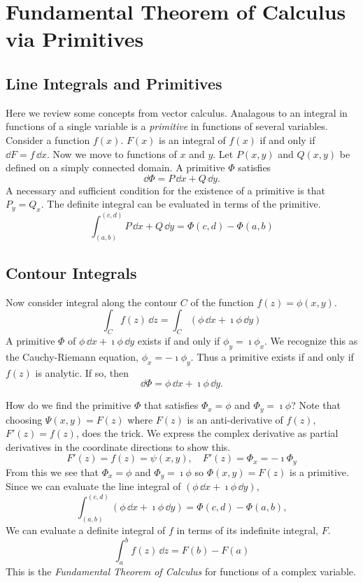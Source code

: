 \section{Fundamental Theorem of Calculus via Primitives}



\subsection{Line Integrals and Primitives}


Here we review some concepts from vector calculus.  Analagous to an
integral in functions of a single variable is a \textit{primitive} in
functions of several variables.  Consider a function $f(x)$.  $F(x)$
is an integral of $f(x)$ if and only if $\dd F = f\,\dd x$.  Now we
move to functions of $x$ and $y$.  Let $P(x,y)$ and $Q(x,y)$ be
defined on a simply connected domain.  A primitive $\Phi$ satisfies
\[
\dd \Phi = P \,\dd x + Q \,\dd y.
\]
A necessary and sufficient condition for the existence of a primitive
is that $P_y = Q_x$.  
The definite integral can be evaluated in terms of the primitive.
\[
\int_{(a,b)}^{(c,d)} P \,\dd x + Q \,\dd y = \Phi(c,d) - \Phi(a,b)
\]



\subsection{Contour Integrals}


Now consider integral along the contour $C$ of the function 
$f(z) = \phi(x,y)$.  
\[
\int_C f(z)\,\dd z = \int_C (\phi\,\dd x + \imath \phi\,\dd y)
\]
A primitive $\Phi$ of $\phi\,\dd x + \imath \phi\,\dd y$ exists if and only if
$\phi_y = \imath \phi_x$.  We recognize this as the Cauchy-Riemann equation, $\phi_x = - \imath \phi_y$.
Thus a primitive exists if and only if $f(z)$ is analytic.  If so, then
\[
\dd \Phi = \phi\,\dd x + \imath \phi\,\dd y.
\]

How do we find the primitive $\Phi$ that satisfies
$\Phi_x = \phi$ and $\Phi_y = \imath \phi$?  Note that choosing $\Psi(x,y) = F(z)$
where $F(z)$ is an anti-derivative of $f(z)$, $F'(z) = f(z)$, does the trick.
We express the complex derivative as partial derivatives in the coordinate 
directions to show this.
\[
F'(z) = f(z) = \psi(x,y), \quad F'(z) = \Phi_x = - \imath \Phi_y
\]
From this we see that $\Phi_x = \phi$ and $\Phi_y = \imath \phi$ so $\Phi(x,y) = F(z)$ 
is a primitive.
Since we can evaluate the line integral of $(\phi\,\dd x + \imath \phi\,\dd y)$,
\[
\int_{(a,b)}^{(c,d)} (\phi\,\dd x + \imath \phi\,\dd y) = \Phi(c,d) - \Phi(a,b),
\]
We can evaluate a definite integral of $f$ in terms of its indefinite 
integral, $F$.
\[
\int_a^b f(z) \,\dd z = F(b) - F(a)
\]
This is the \textit{Fundamental Theorem of Calculus} 
for functions of a complex variable.








